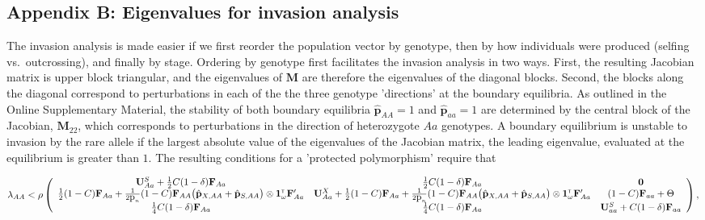 \documentclass[11pt,draft]{article}
\def\mbf#1{\mathbf{#1}}
\newcommand{\tr}{{\mbox{\tiny \sf T}}}
\begin{document}
\begin{landscape}
\section*{Appendix B: Eigenvalues for invasion analysis}
\renewcommand{\theequation}{B\arabic{equation}}
\setcounter{equation}{0}  %
\setcounter{table}{0}  %

The invasion analysis is made easier if we first reorder the population vector by genotype, then by how individuals were produced (selfing vs.~outcrossing), and finally by stage. Ordering by genotype first facilitates the invasion analysis in two ways. First, the resulting Jacobian matrix is upper block triangular, and the eigenvalues of $\mbf{M}$ are therefore the eigenvalues of the diagonal blocks. Second, the blocks along the diagonal correspond to perturbations in each of the the three genotype 'directions' at the boundary equilibria. As outlined in the Online Supplementary Material, the stability of both boundary equilibria $\hat{\mbf{p}}_{AA} = 1$ and $\hat{\mbf{p}}_{aa} = 1$ are determined by the central block of the Jacobian, $\mbf{M}_{22}$, which corresponds to perturbations in the direction of heterozygote $Aa$ genotypes. A boundary equilibrium is unstable to invasion by the rare allele if the largest absolute value of the eigenvalues of the Jacobian matrix, the leading eigenvalue, evaluated at the equilibrium is greater than $1$. The resulting conditions for a 'protected polymorphism' require that

{\footnotesize
\begin{linenomath*}
 \begin{equation} \label{eq:coexist_AA}
	\lambda_{AA} < 
			\rho\left(\begin{array}{ccc}
\mathbf{U}^S_{Aa} +\frac{1}{2} C (1 - \delta) \mbf{F}_{Aa} & \frac{1}{2} C (1 - \delta) \mbf{F}_{Aa}  & \mbf{0} \\
 \frac{1}{2} (1 - C) \mbf{F}_{Aa}+\frac{1}{2  \mbox{p}_{n}} (1 - C)\mbf{F}_{AA} \big(\hat{\mbf{p}}_{X,AA}+ \hat{\mbf{p}}_{S,AA}  \big) \otimes \mathbf{1}^\tr_{\omega} \mathbf{F}_{Aa}^\prime &\mathbf{U}^X_{Aa} + \frac{1}{2} (1 - C) \mbf{F}_{Aa} +\frac{1}{2  \mbox{p}_{n}} (1 - C)\mbf{F}_{AA} \big(\hat{\mbf{p}}_{X,AA}+ \hat{\mbf{p}}_{S,AA}  \big) \otimes \mathbf{1}^\tr_{\omega} \mathbf{F}_{Aa}^\prime & (1-C)\mbf{F}_{aa} + \Theta\\
  \frac{1}{4} C (1 - \delta) \mbf{F}_{Aa} & \frac{1}{4} C (1 - \delta) \mbf{F}_{Aa}  &\mathbf{U}^S_{aa} +C (1 - \delta) \mbf{F}_{aa}  \\ 
			\end{array} \right), \\ 
\end{equation} 
\end{linenomath*}
 
}
\end{landscape}
\end{document}
